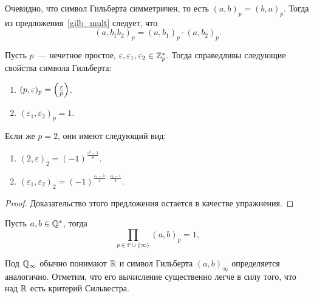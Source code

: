 		\begin{remark}
			Очевидно, что символ Гильберта симметричен, то есть $(a, b)_{p} = (b, a)_{p}$. Тогда из предложения~\ref{gilb_mult} следует, что 
			\[
				(a, b_{1} b_{2})_{p} = (a, b_{1})_{p} \cdot (a, b_{2})_{p}.
			\]
		\end{remark}

		\begin{statement}\label{calc_guilb} 
			Пусть $p$~--- нечетное простое, $\varepsilon, \varepsilon_1, \varepsilon_2 \in \Z_{p}^{*}$. Тогда справедливы следующие свойства символа Гильберта: 
			\begin{enumerate}
				\item $(p, \varepsilon)_{p} = \lr*{\frac{\varepsilon}{p}}$.
				\item $(\varepsilon_1, \varepsilon_2)_{p} = 1$.
			\end{enumerate}
			Если же $p = 2$, они имеют следующий вид: 
			\begin{enumerate}
				\item $(2, \varepsilon)_{2} = (-1)^{\frac{\varepsilon^2 - 1}{8}}$.
				\item $(\varepsilon_1, \varepsilon_2)_{2} = (-1)^{\frac{\varepsilon_1 - 1}{2} \cdot \frac{\varepsilon_2 - 1}{2}}$. 
			\end{enumerate}
		\end{statement}
		\begin{proof}
			Доказательство этого предложения остается в качестве упражнения.
		\end{proof}

		\begin{theorem} 
			Пусть $a, b \in \Q^{*}$, тогда 
			\[
				\prod_{p \in \mathbb{P} \cup \{ \infty \}} (a, b)_{p} = 1,
			\]
		\end{theorem}

		\begin{remark}
			Под $\Q_{\infty}$ обычно понимают $\R$ и символ Гильберта $(a, b)_{\infty}$ определяется аналогично. Отметим, что его вычисление существенно легче в силу того, что над $\R$ есть критерий Сильвестра. 
		\end{remark}

